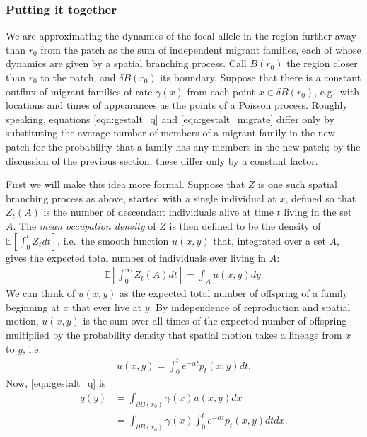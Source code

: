 \documentclass{article}
\newcommand{\E}{\mathbb{E}}
\begin{document}
\subsubsection*{Putting it together}

We are approximating the dynamics of the focal allele in the region further away than $r_0$ from the patch
as the sum of independent migrant families, each of whose dynamics are given by a spatial branching process.
Call $B(r_0)$ the region closer than $r_0$ to the patch, and $\delta B(r_0)$ its boundary.
Suppose that there is a constant outflux of migrant families of rate $\gamma(x)$ from each point $x \in \delta B(r_0)$,
e.g.\ with locations and times of appearances as the points of a Poisson process.
Roughly speaking, equations \eqref{eqn:gestalt_q} and \eqref{eqn:gestalt_migrate}
differ only by substituting the average number of members of a migrant family in the new patch
for the probability that a family has any members in the new patch;
by the discussion of the previous section, these differ only by a constant factor.

First we will make this idea more formal.
Suppose that $Z$ is one such spatial branching process as above, started with a single individual at $x$,
defined so that $Z_t(A)$ is the number of descendant individuals alive at time $t$ living in the set $A$.
The \emph{mean occupation density} of $Z$ is then defined to be the density of $\E[\int_0^t Z_t dt]$,
i.e.\ the smooth function $u(x,y)$ that, integrated over a set $A$, 
gives the expected total number of individuals ever living in $A$:
\begin{align} \label{eqn:occupation_density_defn}
    \E\left[ \int_0^\infty Z_t(A) dt \right] = \int_A u(x,y) dy .
\end{align}
We can think of $u(x,y)$ as the expected total number of offspring of a family beginning at $x$
that ever live at $y$.
By independence of reproduction and spatial motion,
$u(x,y)$ is the sum over all times of the expected number of offspring
multiplied by the probability density that spatial motion takes a lineage from $x$ to $y$,
i.e.\
\begin{align}
    u(x,y) = \int_0^t e^{-\alpha t} p_t(x,y) dt .
\end{align}
Now, \eqref{eqn:gestalt_q} is
\begin{align}
    q(y) &= \int_{\partial B(r_0)} \gamma(x) u(x,y) dx  \\
         &= \int_{\partial B(r_0)} \gamma(x) \int_0^t e^{-\alpha t} p_t(x,y) dt dx .
\end{align}
\end{document}
